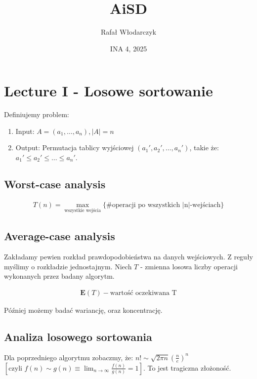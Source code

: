 \documentclass{article}
\title{AiSD}
\author{Rafał Włodarczyk}
\date{INA 4, 2025}
\begin{document}
\maketitle

\tableofcontents

\section{Lecture I - Losowe sortowanie}

Definiujemy problem:

\begin{enumerate}
    \item Input: $A=(a_1,\dots,a_n), |A|=n$
    \item Output: Permutacja tablicy wyjściowej $(a_1',a_2',\dots,a_n')$, takie że: $a_1'\leq a_2' \leq \dots \leq a_n'$.
\end{enumerate}

\subsection{Worst-case analysis}

\begin{align}
    T(n) = \max_{\text{wszystkie wejścia}}\{\text{\#operacji po wszystkich |n|-wejściach}\}
\end{align}

\subsection{Average-case analysis}

Zakładamy pewien rozkład prawdopodobieństwa na danych wejściowych. Z reguły myślimy o rozkładzie jednostajnym. Niech $T$ - zmienna losowa liczby operacji wykonanych przez badany algorytm.

\begin{align}
    \mathbf{E}(T) - \text{wartość oczekiwana T}
\end{align}

\noindent
Później możemy badać wariancję, oraz koncentrację.

\subsection{Analiza losowego sortowania}

Dla poprzedniego algorytmu zobaczmy, że: $n! \sim \sqrt{2\pi n} \left(\frac{n}{e}\right)^n$ $\left[\text{czyli } f(n)\sim g(n) \equiv \lim_{n\rightarrow \infty} \frac{f(n)}{g(n)} = 1 \right]$. To jest tragiczna złożoność.
\end{document}

